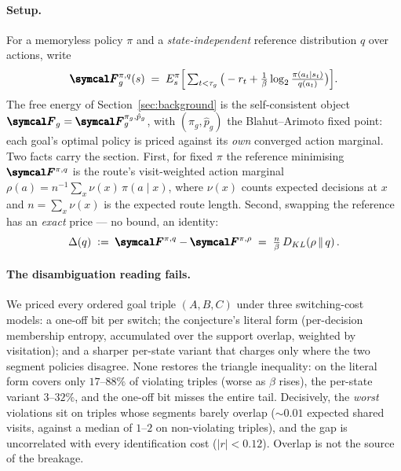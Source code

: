 \documentclass[a4paper, notitlepage, 11pt]{article}
\theoremstyle{plain}
\begin{document}
\paragraph{Setup.}  For a memoryless policy $\pi$ and a
\emph{state-independent} reference distribution $q$ over actions, write
\[
  \Fen^{\pi, q}_g(s) \;=\;
  \mathbb{E}^{\pi}_s \Big[ \textstyle\sum_{t < \tau_g}
  \big( -r_t + \tfrac{1}{\beta}
  \log_2 \tfrac{\pi(a_t \mid s_t)}{q(a_t)} \big) \Big].
\]
The free energy of Section~\ref{sec:background} is the self-consistent
object $\Fen_g = \Fen^{\pi_g, \hat{p}_g}_g$, with
$(\pi_g, \hat{p}_g)$ the Blahut--Arimoto fixed point: each goal's
optimal policy is priced against its \emph{own} converged action
marginal.  Two facts carry the section.  First, for fixed $\pi$ the
reference minimising $\Fen^{\pi,q}$ is the route's visit-weighted action
marginal $\rho(a) = n^{-1} \sum_x \nu(x)\, \pi(a \mid x)$, where
$\nu(x)$ counts expected decisions at $x$ and $n = \sum_x \nu(x)$ is the
expected route length.  Second, swapping the reference has an
\emph{exact} price --- no bound, an identity:
\begin{equation}
  \Delta(q) \;\defeq\; \Fen^{\pi, q} - \Fen^{\pi, \rho}
  \;=\; \tfrac{n}{\beta}\, D_{\mathrm{KL}}\!\left( \rho \,\middle\|\, q \right).
  \label{eq:prior-swap}
\end{equation}

\paragraph{The disambiguation reading fails.}  We priced every ordered
goal triple $(A, B, C)$ under three switching-cost models: a one-off bit
per switch; the conjecture's literal form (per-decision membership
entropy, accumulated over the support overlap, weighted by visitation);
and a sharper per-state variant that charges only where the two segment
policies disagree.  None restores the triangle inequality: on
 the literal form covers only $17$--$88\%$ of
violating triples (worse as $\beta$ rises), the per-state variant
$3$--$32\%$, and the one-off bit misses the entire tail.  Decisively,
the \emph{worst} violations sit on triples whose segments barely overlap
($\sim 0.01$ expected shared visits, against a median of $1$--$2$ on
non-violating triples), and the gap is uncorrelated with every
identification cost ($|r| < 0.12$).  Overlap is not the source of the
breakage.
\end{document}
